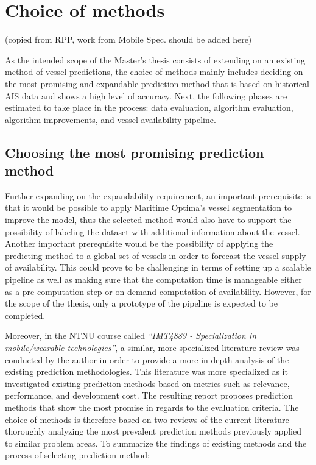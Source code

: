 \chapter{Choice of methods}

(copied from RPP, work from Mobile Spec. should be added here)

As the intended scope of the Master’s thesis consists of extending on an existing method of vessel predictions, the choice of methods mainly includes deciding on the most promising and expandable prediction method that is based on historical AIS data and shows a high level of accuracy. Next, the following phases are estimated to take place in the process: data evaluation, algorithm evaluation, algorithm improvements, and vessel availability pipeline.

\section{Choosing the most promising prediction method}

Further expanding on the expandability requirement, an important prerequisite is that it would be possible to apply Maritime Optima’s vessel segmentation to improve the model, thus the selected method would also have to support the possibility of labeling the dataset with additional information about the vessel. Another important prerequisite would be the possibility of applying the predicting method to a global set of vessels in order to forecast the vessel supply of availability. This could prove to be challenging in terms of setting up a scalable pipeline as well as making sure that the computation time is manageable either as a pre-computation step or on-demand computation of availability. However, for the scope of the thesis, only a prototype of the pipeline is expected to be completed.

Moreover, in the NTNU course called \textit{“IMT4889 - Specialization in mobile/wearable technologies”}, a similar, more specialized literature review was conducted by the author in order to provide a more in-depth analysis of the existing prediction methodologies. This literature was more specialized as it investigated existing prediction methods based on metrics such as relevance, performance, and development cost. The resulting report proposes prediction methods that show the most promise in regards to the evaluation criteria. The choice of methods is therefore based on two reviews of the current literature thoroughly analyzing the most prevalent prediction methods previously applied to similar problem areas. To summarize the findings of existing methods and the process of selecting prediction method:

